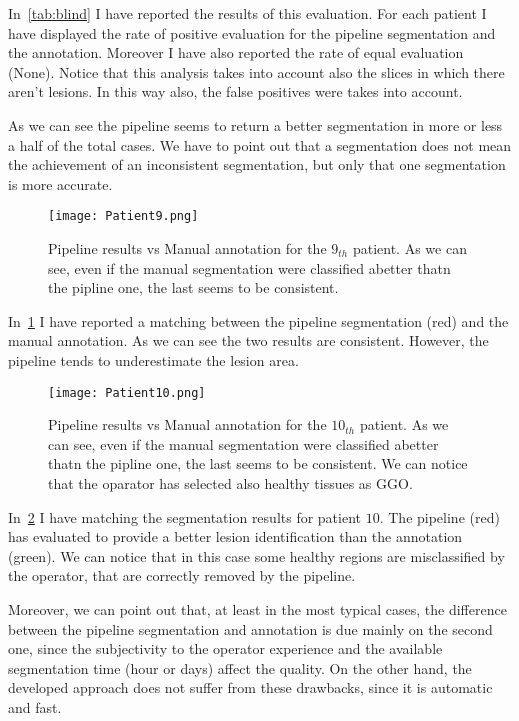 \documentclass{standalone}
\begin{document}
	In \tablename\,\ref{tab:blind} I have reported the results of this evaluation. For each patient I have displayed the rate of positive evaluation for the pipeline segmentation and the annotation. Moreover I have also reported the rate of equal evaluation (None). Notice that this analysis takes into account also the slices in which there aren't lesions. In this way also, the false positives were takes into account. 

	As we can see the pipeline seems to return a better segmentation in more or less a half of the total cases. We have to point out that a  segmentation does not mean the achievement of an inconsistent segmentation, but only that one segmentation is more accurate. 
	
	\begin{figure}
		\centering
		\texttt{[image: Patient9.png]}
		\caption{Pipeline results vs Manual annotation for the $9_{th}$ patient. As we can see, even if the manual segmentation were classified abetter thatn the pipline one, the last seems to be consistent.}\label{fig:Patient9}
	\end{figure}

	In \figurename\,\ref{fig:Patient9} I have reported a matching between the pipeline segmentation (red) and the manual annotation. As we can see the two results are consistent. However, the pipeline tends to underestimate the lesion area. 
	
	\begin{figure}
		\centering
		\texttt{[image: Patient10.png]}
		\caption{Pipeline results vs Manual annotation for the $10_{th}$ patient. As we can see, even if the manual segmentation were classified abetter thatn the pipline one, the last seems to be consistent. We can notice that the oparator has selected also healthy tissues as GGO. }\label{fig:Patient10}
	\end{figure}
	
	In \figurename\,\ref{fig:Patient10} I have matching the segmentation results for patient $10$. The pipeline (red) has evaluated to provide a better lesion identification than the annotation (green). We can notice that in this case some healthy regions are misclassified by the operator, that are correctly removed by the pipeline.
	
	Moreover, we can point out that, at least in the most typical cases, the difference between the pipeline segmentation and annotation is due mainly on the second one, since the subjectivity to the operator experience and the available segmentation time (hour or days) affect the quality. On the other hand, the developed approach does not suffer from these drawbacks, since it is automatic and fast. 
	
\end{document}
